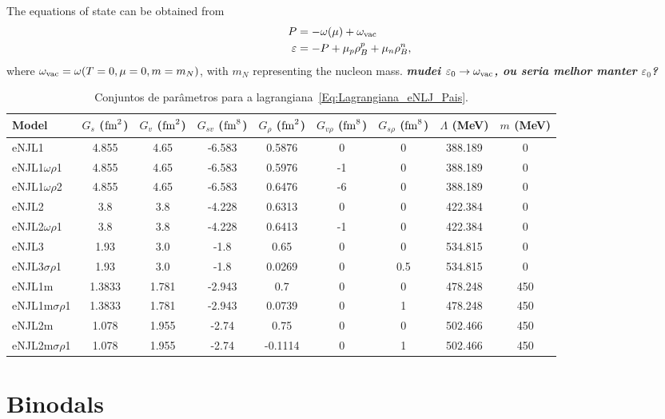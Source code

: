 \documentclass[prc, reprint, amsmath, floatfix, linenumbers,10pt]{revtex4-1}
\newcommand{\comment}[1]{{\bf\textit{#1}}}
\begin{document}
The equations of state can be obtained from
\begin{align}
	P &= -\omega(\mu) + \omega_{\rm{vac}} \\
	\varepsilon &= -P + \mu_p \rho_B^p + \mu_n \rho_B^n,
\end{align}
%
where $\omega_{\rm{vac}} = \omega(T = 0, \mu = 0, m = m_N)$, with $m_N$ representing the nucleon mass. \comment{mudei $\varepsilon_0 \to \omega_{\rm{vac}}$, ou seria melhor manter $\varepsilon_0$?} 


\begin{table*}
\caption{Conjuntos de parâmetros para a lagrangiana~\eqref{Eq:Lagrangiana_eNLJ_Pais}\cite{Pais2016}. \label{Tab:Parametros_eNJL}}
\begin{ruledtabular}
\begin{tabular}{lcccccccc}
Model & $G_s$ ($\rm{fm}^2$) & $G_v$ ($\rm{fm}^2$) & $G_{sv}$ ($\rm{fm}^8$) & $G_\rho$ ($\rm{fm}^2$) & $G_{v\rho}$ ($\rm{fm}^8$) & $G_{s\rho}$ ($\rm{fm}^8$) & $\Lambda$ (MeV) & $m$ (MeV) \\
\hline
eNJL1 & 4.855 & 4.65 & -6.583 & 0.5876 & 0 & 0 & 388.189 & 0 \\
eNJL1$\omega\rho$1 & 4.855 & 4.65 & -6.583 & 0.5976 & -1 & 0 & 388.189 & 0 \\
eNJL1$\omega\rho$2 & 4.855 & 4.65 & -6.583 & 0.6476 & -6 & 0 & 388.189 & 0 \\
eNJL2 & 3.8 & 3.8 & -4.228 & 0.6313 & 0 & 0 & 422.384 & 0 \\
eNJL2$\omega\rho$1 & 3.8 & 3.8 & -4.228 & 0.6413 & -1 & 0 & 422.384 & 0 \\
eNJL3 & 1.93 & 3.0 & -1.8 & 0.65 & 0 & 0 & 534.815 & 0 \\
eNJL3$\sigma\rho$1 & 1.93 & 3.0 & -1.8 & 0.0269 & 0 & 0.5 & 534.815 & 0 \\
eNJL1m & 1.3833 & 1.781 & -2.943 & 0.7 & 0 & 0 & 478.248 & 450 \\
eNJL1m$\sigma\rho$1 & 1.3833 & 1.781 & -2.943 & 0.0739 & 0 & 1 & 478.248 & 450 \\
eNJL2m & 1.078 & 1.955 & -2.74 & 0.75 & 0 & 0 & 502.466 & 450 \\
eNJL2m$\sigma\rho$1 & 1.078 & 1.955 & -2.74 & -0.1114 & 0 & 1 & 502.466 & 450 \\
\end{tabular}
\end{ruledtabular}
\end{table*}

\section{Binodals}
\end{document}
